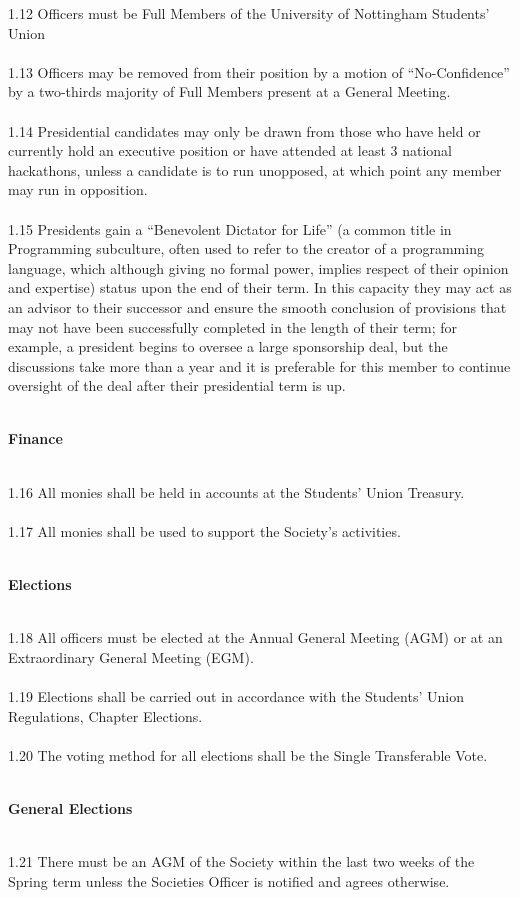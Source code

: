 \documentclass[a4paper,twoside,notitlepage,11pt]{article}
\newcommand{\consHead}[1]{\begin{Large}\textbf{#1}\end{Large}\ \\}
\begin{document}
1.12 Officers must be Full Members of the University of Nottingham Students' Union\ \\
\ \\
1.13 Officers may be removed from their position by a motion of ``No-Confidence'' by a two-thirds majority of Full Members present at a General Meeting.\ \\
\ \\
1.14 Presidential candidates may only be drawn from those who have held or currently hold an executive position or have attended at least 3 national hackathons, unless a candidate is to run unopposed, at which point any member may run in opposition.\ \\
\ \\
1.15 Presidents gain a ``Benevolent Dictator for Life'' (a common title in Programming subculture, often used to refer to the creator of a programming language, which although giving no formal power, implies respect of their opinion and expertise) status upon the end of their term. In this capacity they may act as an advisor to their successor and ensure the smooth conclusion of provisions that may not have been successfully completed in the length of their term; for example, a president begins to oversee a large sponsorship deal, but the discussions take more than a year and it is preferable for this member to continue oversight of the deal after their presidential term is up.\ \\
\ \\
\consHead{Finance}
1.16 All monies shall be held in accounts at the Students' Union Treasury.\ \\
\ \\
1.17 All monies shall be used to support the Society's activities.\ \\
\ \\
\consHead{Elections}
1.18 All officers must be elected at the Annual General Meeting (AGM) or at an Extraordinary General Meeting (EGM).\ \\
\ \\
1.19 Elections shall be carried out in accordance with the Students' Union Regulations, Chapter Elections.\ \\
\ \\
1.20 The voting method for all elections shall be the Single Transferable Vote.\ \\
\ \\
\consHead{General Elections}
1.21 There must be an AGM of the Society within the last two weeks of the Spring term unless the Societies Officer is notified and agrees otherwise.\ \\
\end{document}
